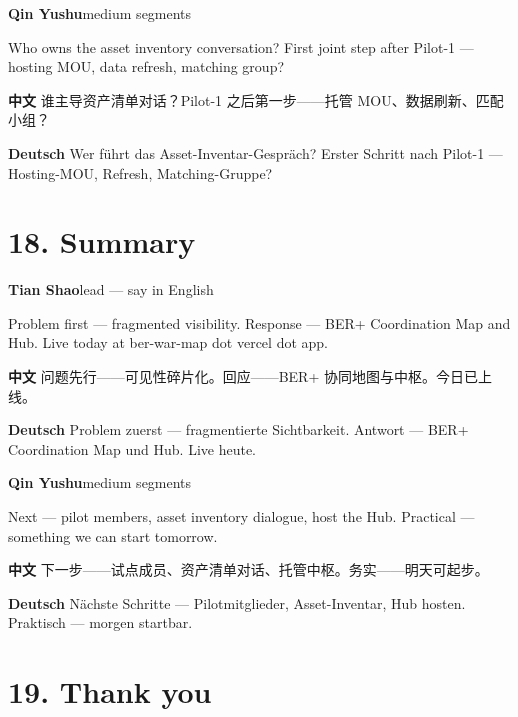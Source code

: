 \documentclass[11pt,a4paper]{ctexart}
\newenvironment{speakerblock}[2]{%
  \par\medskip
  {\color{berblue}\textbf{#1}}\hfill{\small\textcolor{bergrey}{#2}}\par
  \vspace{0.25em}
}{\par\medskip}
\begin{document}
\begin{speakerblock}{Qin Yushu}{medium segments}
\begin{englishbox}
Who owns the asset inventory conversation? First joint step after Pilot-1 — hosting MOU, data refresh, matching group?
\end{englishbox}

\textbf{中文} 谁主导资产清单对话？Pilot-1 之后第一步——托管 MOU、数据刷新、匹配小组？

\textbf{Deutsch} Wer führt das Asset-Inventar-Gespräch? Erster Schritt nach Pilot-1 — Hosting-MOU, Refresh, Matching-Gruppe?
\end{speakerblock}



\section{18. Summary}

\begin{speakerblock}{Tian Shao}{lead — say in English}
\begin{englishbox}
Problem first — fragmented visibility. Response — BER+ Coordination Map and Hub. Live today at ber-war-map dot vercel dot app.
\end{englishbox}

\textbf{中文} 问题先行——可见性碎片化。回应——BER+ 协同地图与中枢。今日已上线。

\textbf{Deutsch} Problem zuerst — fragmentierte Sichtbarkeit. Antwort — BER+ Coordination Map und Hub. Live heute.
\end{speakerblock}


\begin{speakerblock}{Qin Yushu}{medium segments}
\begin{englishbox}
Next — pilot members, asset inventory dialogue, host the Hub. Practical — something we can start tomorrow.
\end{englishbox}

\textbf{中文} 下一步——试点成员、资产清单对话、托管中枢。务实——明天可起步。

\textbf{Deutsch} Nächste Schritte — Pilotmitglieder, Asset-Inventar, Hub hosten. Praktisch — morgen startbar.
\end{speakerblock}



\section{19. Thank you}
\end{document}
